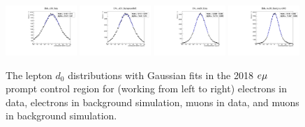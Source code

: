 \begin{figure}
\centering
\includegraphics[width=0.24\textwidth]{figures/corrections/d0_smearing/emu_2018/gaussian_fit_EMu_eD0_Data.pdf}
\includegraphics[width=0.24\textwidth]{figures/corrections/d0_smearing/emu_2018/gaussian_fit_EMu_eD0_BackgroundMC.pdf}
\includegraphics[width=0.24\textwidth]{figures/corrections/d0_smearing/emu_2018/gaussian_fit_EMu_muD0_Data.pdf} 
\includegraphics[width=0.24\textwidth]{figures/corrections/d0_smearing/emu_2018/gaussian_fit_EMu_muD0_BackgroundMC.pdf}
\caption{The lepton $d_0$ distributions with Gaussian fits in the 2018 $e{\mu}$ prompt control region for (working from left to right) electrons in data, electrons in background simulation, muons in data, and muons in background simulation.}
\label{gaussian_fits_2018}
\end{figure}